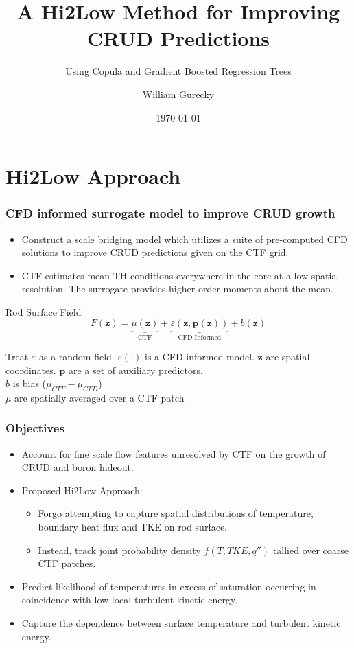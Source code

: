 \documentclass[t, pdftex]{beamer}
\title{A Hi2Low Method for Improving\\ CRUD Predictions}
\subtitle{Using Copula and Gradient Boosted Regression Trees}
\author{William Gurecky}
\institute{PhD Proposal}
\date{\today}
\begin{document}
\titleframe
{}

\section{Hi2Low Approach}
\begin{frame}
    \frametitle{CFD informed surrogate model to improve CRUD growth}
    \begin{itemize}
    \item Construct a scale bridging model which utilizes a suite of pre-computed CFD solutions to improve CRUD predictions given on the CTF grid. 
    \item CTF estimates mean TH conditions everywhere in the core at a low spatial resolution.  The surrogate provides higher order moments about the mean.
    \end{itemize}
    \begin{block}{Rod Surface Field}
        \[ 
        F(\mathbf z) = \underbrace{\mu(\mathbf{z})}_\text{CTF} + \underbrace{\varepsilon({\mathbf z, \mathbf p(\mathbf z)})}_\text{CFD Informed} + b(\mathbf{z})
        \]
    \end{block}
    Treat $\varepsilon$ as a random field.  $\varepsilon(\cdot)$ is a CFD informed model. $\mathbf z$ are spatial coordinates. $\mathbf p$ are a set of auxiliary predictors. \\
    $b$ is bias ($\mu_{CTF} - \mu_{CFD}$) \\
    $\mu$ are spatially averaged over a CTF patch
\end{frame}

\begin{frame}\frametitle{Objectives}
\begin{itemize}
\item Account for fine scale flow features unresolved by CTF on the growth of CRUD and boron hideout.
\item Proposed Hi2Low Approach:
\begin{itemize}
	\item Forgo attempting to capture spatial distributions of temperature, boundary heat flux and TKE on rod surface. 
	\item Instead, track joint probability density $f(T, TKE, q'')$ tallied over coarse CTF patches.
\end{itemize}
	\item Predict likelihood of temperatures in excess of saturation occurring in coincidence with low local turbulent kinetic energy.
	\item Capture the dependence between surface temperature and turbulent kinetic energy.
\end{itemize}
\end{frame}
\end{document}
